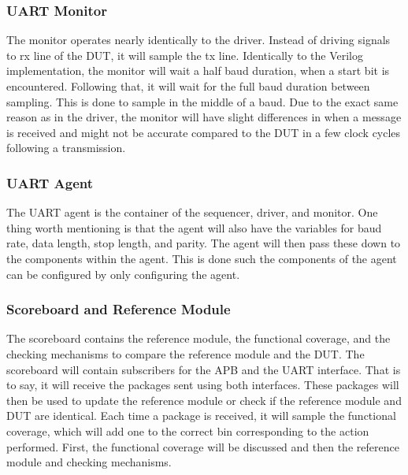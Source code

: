 \documentclass[./dissertation.tex]{subfiles}
\begin{document}
\subsubsection{UART Monitor}
The monitor operates nearly identically to the driver. Instead of driving signals to rx line of the DUT, it will sample the tx line. Identically to the Verilog implementation, the monitor will wait a half baud duration, when a start bit is encountered. Following that, it will wait for the full baud duration between sampling. This is done to sample in the middle of a baud. Due to the exact same reason as in the driver, the monitor will have slight differences in when a message is received and might not be accurate compared to the DUT in a few clock cycles following a transmission.  

\subsubsection{UART Agent}
The UART agent is the container of the sequencer, driver, and monitor. One thing worth mentioning is that the agent will also have the variables for baud rate, data length, stop length, and parity. The agent will then pass these down to the components within the agent. This is done such the components of the agent can be configured by only configuring the agent.

\subsubsection{Scoreboard and Reference Module}
The scoreboard contains the reference module, the functional coverage, and the checking mechanisms to compare the reference module and the DUT. The scoreboard will contain subscribers for the APB and the UART interface. That is to say, it will receive the packages sent using both interfaces. These packages will then be used to update the reference module or check if the reference module and DUT are identical. Each time a package is received, it will sample the functional coverage, which will add one to the correct bin corresponding to the action performed. First, the functional coverage will be discussed and then the reference module and checking mechanisms.
\end{document}
